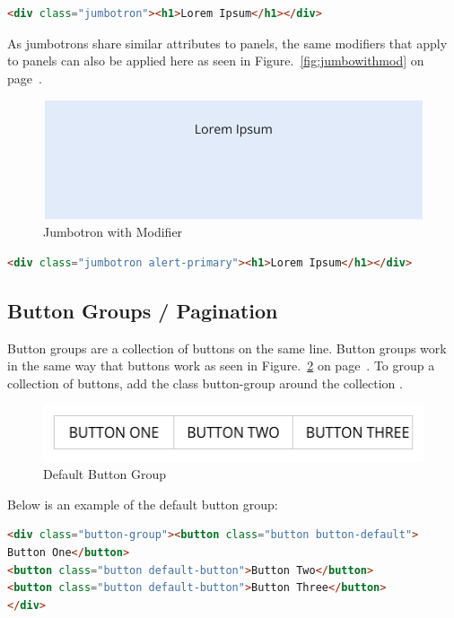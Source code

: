 \begin{lstlisting}[language=HTML]
<div class="jumbotron"><h1>Lorem Ipsum</h1></div>
\end{lstlisting}

As jumbotrons share similar attributes to panels, the same modifiers that apply to panels can also be applied here as seen in Figure.~\ref{fig:jumbowithmod} on  page~\pageref{fig:jumbowithmod}. 

 \begin{figure}[h]
\centering
  \includegraphics[scale=0.4]{images/jumbowithmod}
  \caption{Jumbotron with Modifier}
  \label{fig:jumbo}
\end{figure}

\begin{lstlisting}[language=HTML]
<div class="jumbotron alert-primary"><h1>Lorem Ipsum</h1></div>
\end{lstlisting}

\subsection*{Button Groups / Pagination}
Button groups are a collection of buttons on the same line. Button groups work in the same way that buttons work as seen in Figure.~\ref{fig:defualtgroup} on  page~\pageref{fig:defualtgroup}. To group a collection of buttons, add the class button-group around the collection . 


\begin{figure}[h]
\centering
\includegraphics[scale=0.3]{images/button-group=defualt}
\caption{Default Button Group}
  \label{fig:defualtgroup}
\end{figure}

Below is an example of the default button group: 

\begin{lstlisting}[language=HTML]
<div class="button-group"><button class="button button-default">
Button One</button>
<button class="button default-button">Button Two</button>
<button class="button default-button">Button Three</button>
</div>
\end{lstlisting}

